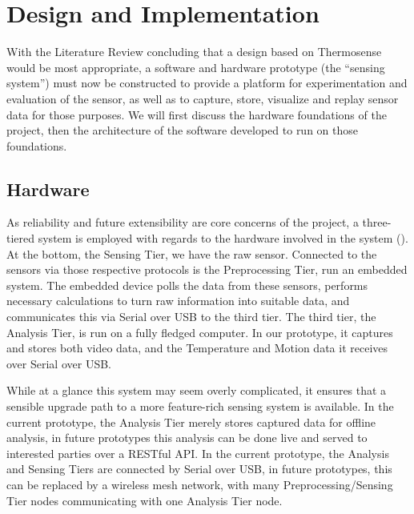 \documentclass[../thesis/thesis.tex]{subfiles}
\begin{document}
 \chapter{Design and Implementation}
 \label{chap:design}

With the Literature Review concluding that a design based on Thermosense would be most appropriate, a software and hardware prototype (the ``sensing system'') must now be constructed to provide a platform for experimentation and evaluation of the sensor, as well as to capture, store, visualize and replay sensor data for those purposes. We will first discuss the hardware foundations of the project, then the architecture of the software developed to run on those foundations.

\section{Hardware}

As reliability and future extensibility are core concerns of the project, a three-tiered system is employed with regards to the hardware involved in the system (). At the bottom, the Sensing Tier, we have the raw sensor. Connected to the sensors via those respective protocols is the Preprocessing Tier, run an embedded system. The embedded device polls the data from these sensors, performs necessary calculations to turn raw information into suitable data, and communicates this via Serial over USB to the third tier. The third tier, the Analysis Tier, is run on a fully fledged computer. In our prototype, it captures and stores both video data, and the Temperature and Motion data it receives over Serial over USB.

While at a glance this system may seem overly complicated, it ensures that a sensible upgrade path to a more feature-rich sensing system is available. In the current prototype, the Analysis Tier merely stores captured data for offline analysis, in future prototypes this analysis can be done live and served to interested parties over a RESTful API. In the current prototype, the Analysis and Sensing Tiers are connected by Serial over USB, in future prototypes, this can be replaced by a wireless mesh network, with many Preprocessing/Sensing Tier nodes communicating with one Analysis Tier node.
\end{document}
